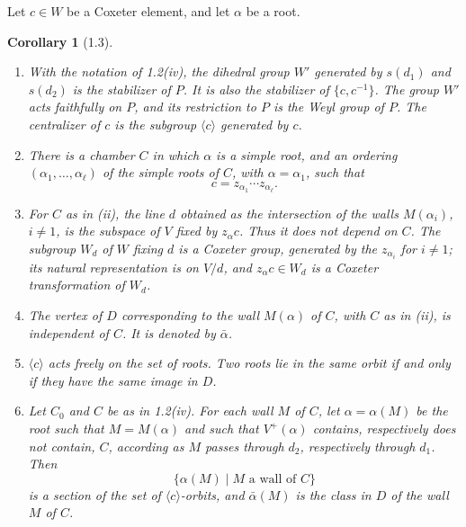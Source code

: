 \documentclass[11pt]{article}
\theoremstyle{plainen}
\newtheorem*{corollaryx}{Corollary}
\begin{document}
Let $c\in W$ be a Coxeter element, and let $\alpha$ be a root.

\begin{corollaryx}[1.3]
\begin{enumerate}[label=(\roman*),leftmargin=2.2em]
\item With the notation of 1.2(iv), the dihedral group $W'$ generated by $s(d_1)$ and $s(d_2)$ is the stabilizer of $P$. It is also the stabilizer of $\{c,c^{-1}\}$. The group $W'$ acts faithfully on $P$, and its restriction to $P$ is the Weyl group of $P$. The centralizer of $c$ is the subgroup $\langle c\rangle$ generated by $c$.

\item There is a chamber $C$ in which $\alpha$ is a simple root, and an ordering $(\alpha_1,\ldots,\alpha_\ell)$ of the simple roots of $C$, with $\alpha=\alpha_1$, such that
\[
 c=z_{\alpha_1}\cdots z_{\alpha_\ell}.
\]

\item For $C$ as in (ii), the line $d$ obtained as the intersection of the walls $M(\alpha_i)$, $i\ne1$, is the subspace of $V$ fixed by $z_\alpha c$. Thus it does not depend on $C$. The subgroup $W_d$ of $W$ fixing $d$ is a Coxeter group, generated by the $z_{\alpha_i}$ for $i\ne1$; its natural representation is on $V/d$, and $z_\alpha c\in W_d$ is a Coxeter transformation of $W_d$.

\item The vertex of $D$ corresponding to the wall $M(\alpha)$ of $C$, with $C$ as in (ii), is independent of $C$. It is denoted by $\bar\alpha$.

\item $\langle c\rangle$ acts freely on the set of roots. Two roots lie in the same orbit if and only if they have the same image in $D$.

\item Let $C_0$ and $C$ be as in 1.2(iv). For each wall $M$ of $C$, let $\alpha=\alpha(M)$ be the root such that $M=M(\alpha)$ and such that $V^+(\alpha)$ contains, respectively does not contain, $C$, according as $M$ passes through $d_2$, respectively through $d_1$. Then
\[
 \{\alpha(M)\mid M\text{ a wall of }C\}
\]
is a section of the set of $\langle c\rangle$-orbits, and $\bar\alpha(M)$ is the class in $D$ of the wall $M$ of $C$.
\end{enumerate}
\end{corollaryx}
\end{document}
